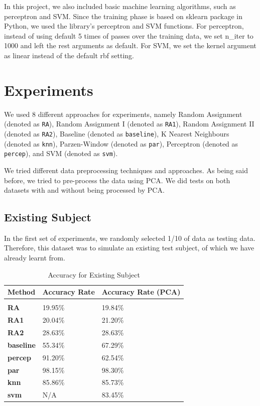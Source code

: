 \documentclass{article} %
\begin{document}
In this project, we also included basic machine learning algorithms, such as perceptron and SVM. Since the training phase is based on sklearn package in Python, we used the library’s perceptron and SVM functions. For perceptron, instead of using default 5 times of passes over the training data, we set n\_iter to 1000 and left the rest arguments as default. For SVM, we set the kernel argument as linear instead of the default rbf setting.

\section{Experiments}

We used 8 different approaches for experiments, namely Random Assignment (denoted as \texttt{RA}), Random Assignment I (denoted as \texttt{RA1}), Random Assignment II (denoted as \texttt{RA2}), Baseline (denoted as \texttt{baseline}), K Nearest Neighbours (denoted as \texttt{knn}), Parzen-Window (denoted as \texttt{par}), Perceptron (denoted as \texttt{percep}), and SVM (denoted as \texttt{svm}).

We tried different data preprocessing techniques and approaches. As being said before, we tried to pre-process the data using PCA. We did tests on both datasets with and without being processed by PCA.

\subsection{Existing Subject}

In the first set of experiments, we randomly selected 1/10 of data as testing data. Therefore, this dataset was to simulate an existing test subject, of which we have already learnt from.

\begin{table}[H]
\caption{Accuracy for Existing Subject}
\begin{center}
\begin{tabular}{lll}
{\bf Method} & {\bf Accuracy Rate} & {\bf Accuracy Rate (PCA)} \\
\hline \\
{\bf RA}       & 19.95\% & 19.84\% \\
{\bf RA1}      & 20.04\% & 21.20\% \\
{\bf RA2}      & 28.63\% & 28.63\% \\
{\bf baseline} & 55.34\% & 67.29\% \\
{\bf percep}   & 91.20\% & 62.54\% \\
{\bf par}      & 98.15\% & 98.30\% \\
{\bf knn}      & 85.86\% & 85.73\% \\
{\bf svm}      & N/A     & 83.45\% \\
\end{tabular}
\end{center}
\end{table}
\end{document}

